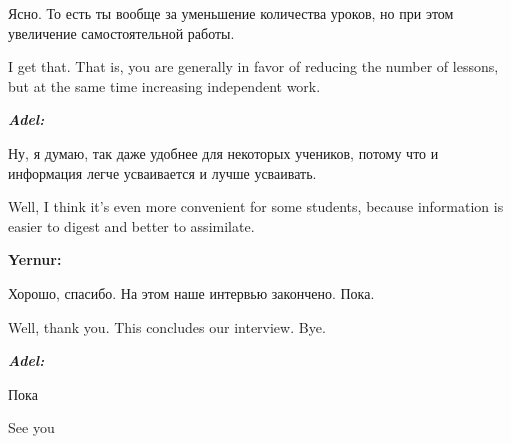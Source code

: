 Ясно. То есть ты вообще за уменьшение количества уроков, но при этом увеличение самостоятельной работы.

I get that. That is, you are generally in favor of reducing the number of lessons, but at the same time increasing independent work.

\textbf{\textit{Adel:}}

Ну, я думаю, так даже удобнее для некоторых учеников, потому что и информация легче усваивается и лучше усваивать.

Well, I think it's even more convenient for some students, because information is easier to digest and better to assimilate.

\textbf{Yernur:}

Хорошо, спасибо. На этом наше интервью закончено. Пока.

Well, thank you. This concludes our interview. Bye.

\textbf{\textit{Adel:}}

Пока

See you